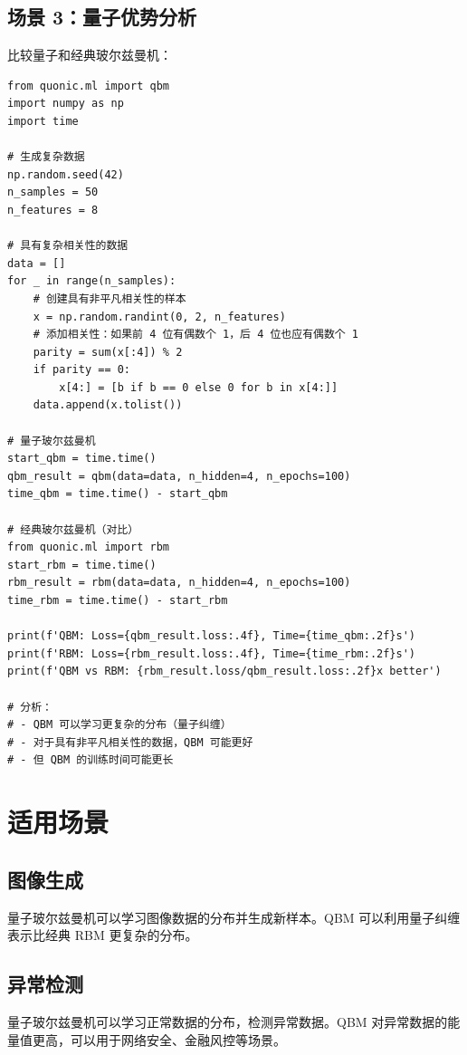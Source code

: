 \documentclass[12pt,a4paper]{article}
\begin{document}
\subsection{场景 3：量子优势分析}

比较量子和经典玻尔兹曼机：

\begin{verbatim}
from quonic.ml import qbm
import numpy as np
import time

# 生成复杂数据
np.random.seed(42)
n_samples = 50
n_features = 8

# 具有复杂相关性的数据
data = []
for _ in range(n_samples):
    # 创建具有非平凡相关性的样本
    x = np.random.randint(0, 2, n_features)
    # 添加相关性：如果前 4 位有偶数个 1，后 4 位也应有偶数个 1
    parity = sum(x[:4]) % 2
    if parity == 0:
        x[4:] = [b if b == 0 else 0 for b in x[4:]]
    data.append(x.tolist())

# 量子玻尔兹曼机
start_qbm = time.time()
qbm_result = qbm(data=data, n_hidden=4, n_epochs=100)
time_qbm = time.time() - start_qbm

# 经典玻尔兹曼机（对比）
from quonic.ml import rbm
start_rbm = time.time()
rbm_result = rbm(data=data, n_hidden=4, n_epochs=100)
time_rbm = time.time() - start_rbm

print(f'QBM: Loss={qbm_result.loss:.4f}, Time={time_qbm:.2f}s')
print(f'RBM: Loss={rbm_result.loss:.4f}, Time={time_rbm:.2f}s')
print(f'QBM vs RBM: {rbm_result.loss/qbm_result.loss:.2f}x better')

# 分析：
# - QBM 可以学习更复杂的分布（量子纠缠）
# - 对于具有非平凡相关性的数据，QBM 可能更好
# - 但 QBM 的训练时间可能更长
\end{verbatim}

\section{适用场景}

\subsection{图像生成}

量子玻尔兹曼机可以学习图像数据的分布并生成新样本。QBM 可以利用量子纠缠表示比经典 RBM 更复杂的分布。

\subsection{异常检测}

量子玻尔兹曼机可以学习正常数据的分布，检测异常数据。QBM 对异常数据的能量值更高，可以用于网络安全、金融风控等场景。
\end{document}
